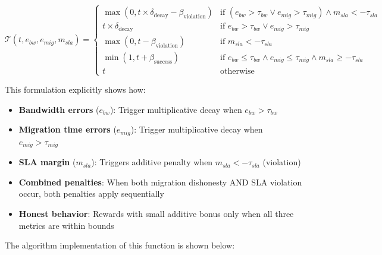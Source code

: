 \documentclass[12pt,a4paper]{article}
\begin{document}
\begin{equation}
\mathcal{T}(t, e_{bw}, e_{mig}, m_{sla}) = \begin{cases}
    \max(0, t \times \delta_{\text{decay}} - \beta_{\text{violation}}) & \text{if } (e_{bw} > \tau_{bw} \lor e_{mig} > \tau_{mig}) \land m_{sla} < -\tau_{sla} \\
    t \times \delta_{\text{decay}} & \text{if } e_{bw} > \tau_{bw} \lor e_{mig} > \tau_{mig} \\
    \max(0, t - \beta_{\text{violation}}) & \text{if } m_{sla} < -\tau_{sla} \\
    \min(1, t + \beta_{\text{success}}) & \text{if } e_{bw} \leq \tau_{bw} \land e_{mig} \leq \tau_{mig} \land m_{sla} \geq -\tau_{sla} \\
    t & \text{otherwise}
\end{cases}
\end{equation}

This formulation explicitly shows how:
\begin{itemize}
    \item \textbf{Bandwidth errors} ($e_{bw}$): Trigger multiplicative decay when $e_{bw} > \tau_{bw}$
    \item \textbf{Migration time errors} ($e_{mig}$): Trigger multiplicative decay when $e_{mig} > \tau_{mig}$
    \item \textbf{SLA margin} ($m_{sla}$): Triggers additive penalty when $m_{sla} < -\tau_{sla}$ (violation)
    \item \textbf{Combined penalties}: When both migration dishonesty AND SLA violation occur, both penalties apply sequentially
    \item \textbf{Honest behavior}: Rewards with small additive bonus only when all three metrics are within bounds
\end{itemize}

The algorithm implementation of this function is shown below:
\end{document}
